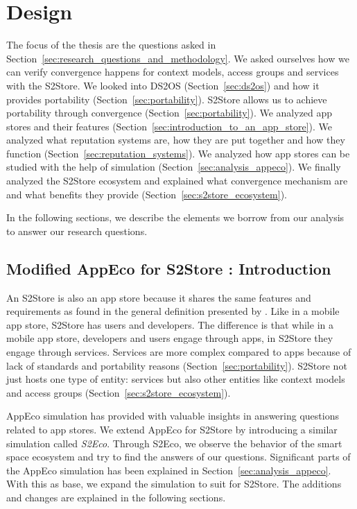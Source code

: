 \chapter{Design}
\label{chap:design}

The focus of the thesis are the questions asked in Section~\ref{sec:research_questions_and_methodology}. We asked ourselves how we can verify convergence happens for context models, access groups and services with the S2Store. We looked into DS2OS (Section~\ref{sec:ds2os}) and how it provides portability (Section~\ref{sec:portability}). S2Store allows us to achieve portability through convergence (Section~\ref{sec:portability}). We analyzed app stores and their features (Section~\ref{sec:introduction_to_an_app_store}). We analyzed what reputation systems are, how they are put together and how they function (Section~\ref{sec:reputation_systems}). We analyzed how app stores can be studied with the help of simulation (Section~\ref{sec:analysis_appeco}). We finally analyzed the S2Store ecosystem and explained what convergence mechanism are and what benefits they provide (Section~\ref{sec:s2store_ecosystem}). 

In the following sections, we describe the elements we borrow from our analysis to answer our research questions.

\section{Modified AppEco for S2Store : Introduction}
\label{sec:s2eco}

An S2Store is also an app store because it shares the same features and requirements as found in the general definition presented by \cite{Jansen}. Like in a mobile app store, S2Store has users and developers. The difference is that while in a mobile app store, developers and users engage through apps, in S2Store they engage through services. Services are more complex compared to apps because of lack of standards and portability reasons (Section~\ref{sec:portability}). S2Store not just hosts one type of entity: services but also other entities like context models and access groups (Section~\ref{sec:s2store_ecosystem}).

AppEco simulation has provided with valuable insights in answering questions related to app stores. We extend AppEco for S2Store by introducing a similar simulation called \emph{S2Eco}. Through S2Eco, we observe the behavior of the smart space ecosystem and try to find the answers of our questions. Significant parts of the AppEco simulation has been explained in Section~\ref{sec:analysis_appeco}. With this as base, we expand the simulation to suit for S2Store. The additions and changes are explained in the following sections.

